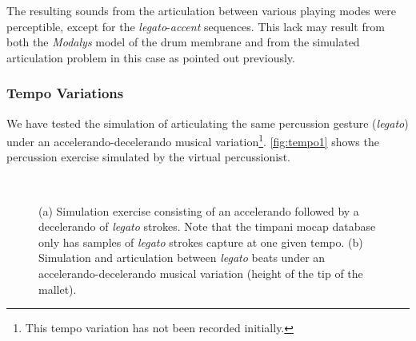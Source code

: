 The resulting sounds from the articulation between various playing modes were perceptible, except for the \emph{legato}-\emph{accent} sequences. This lack may result from both the \emph{Modalys} model of the drum membrane and from the simulated articulation problem in this case as pointed out previously.


			\subsubsection{Tempo Variations}
			\label{subsubsec:Music_Evaluation_Extrapolation_TempoVariations}

We have tested the simulation of articulating the same percussion gesture (\emph{legato}) under an accelerando-decelerando musical variation\footnote{This tempo variation has not been recorded initially.}. \myfigname \ref{fig:tempo1} shows the percussion exercise simulated by the virtual percussionist. 

\begin{figure}%
	\begin{center}
		\\
	\end{center}
	\vspace{-0.5cm}
	\caption[Simulated exercises: extrapolation of tempo variations]{(a) Simulation exercise consisting of an accelerando followed by a decelerando of \emph{legato} strokes. Note that the timpani mocap database only has samples of \emph{legato} strokes capture at one given tempo. (b) Simulation and articulation between \emph{legato} beats under an accelerando-decelerando musical variation (height of the tip of the mallet). %
}
	\label{fig:tempo}
\end{figure}

